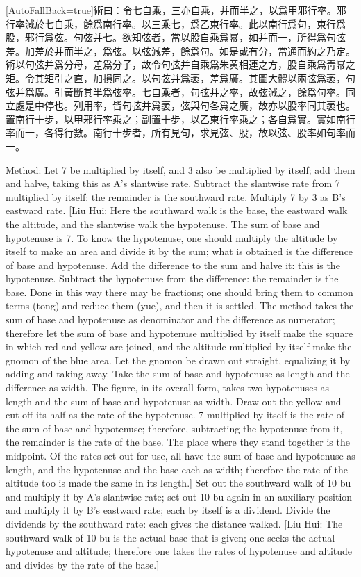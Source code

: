 \documentclass[11pt]{article}
\newcommand{\zhsmall}{\footnotesize\color{black!70}}
\newcommand{\unitlabel}[1]{\marginpar{\raggedleft\tiny\color{gray}#1}}
\newenvironment{unitzh}{\par\CJKfontspec{Noto Serif CJK SC}[AutoFallBack=true]\large\linespread{1.25}\selectfont}{\par}
\newenvironment{uniten}{\par\small\color{black!85}}{\par\medskip}
\begin{document}
\begin{unitzh}\unitlabel{jiuzhang-039.10}術曰：令七自乘，三亦自乘，并而半之，以爲甲邪行率。邪行率減於七自乘，餘爲南行率。以三乘七，爲乙東行率。{\zhsmall 此以南行爲句，東行爲股，邪行爲弦。句弦并七。欲知弦者，當以股自乘爲幂，如并而一，所得爲句弦差。加差於并而半之，爲弦。以弦減差，餘爲句。如是或有分，當通而約之乃定。術以句弦并爲分母，差爲分子，故令句弦并自乘爲朱黄相連之方，股自乘爲靑幂之矩。令其矩引之直，加損同之。以句弦并爲袤，差爲廣。其圖大體以兩弦爲袤，句弦并爲廣。引黃斷其半爲弦率。七自乘者，句弦并之率，故弦減之，餘爲句率。同立處是中停也。列用率，皆句弦并爲袤，弦與句各爲之廣，故亦以股率同其袤也。}置南行十步，以甲邪行率乘之；副置十步，以乙東行率乘之；各自爲實。實如南行率而一，各得行數。{\zhsmall 南行十步者，所有見句，求見弦、股，故以弦、股率如句率而一。}\end{unitzh}
\begin{uniten}Method: Let 7 be multiplied by itself, and 3 also be multiplied by itself; add them and halve, taking this as A's slantwise rate. Subtract the slantwise rate from 7 multiplied by itself: the remainder is the southward rate. Multiply 7 by 3 as B's eastward rate. [Liu Hui: Here the southward walk is the base, the eastward walk the altitude, and the slantwise walk the hypotenuse. The sum of base and hypotenuse is 7. To know the hypotenuse, one should multiply the altitude by itself to make an area and divide it by the sum; what is obtained is the difference of base and hypotenuse. Add the difference to the sum and halve it: this is the hypotenuse. Subtract the hypotenuse from the difference: the remainder is the base. Done in this way there may be fractions; one should bring them to common terms (tong) and reduce them (yue), and then it is settled. The method takes the sum of base and hypotenuse as denominator and the difference as numerator; therefore let the sum of base and hypotenuse multiplied by itself make the square in which red and yellow are joined, and the altitude multiplied by itself make the gnomon of the blue area. Let the gnomon be drawn out straight, equalizing it by adding and taking away. Take the sum of base and hypotenuse as length and the difference as width. The figure, in its overall form, takes two hypotenuses as length and the sum of base and hypotenuse as width. Draw out the yellow and cut off its half as the rate of the hypotenuse. 7 multiplied by itself is the rate of the sum of base and hypotenuse; therefore, subtracting the hypotenuse from it, the remainder is the rate of the base. The place where they stand together is the midpoint. Of the rates set out for use, all have the sum of base and hypotenuse as length, and the hypotenuse and the base each as width; therefore the rate of the altitude too is made the same in its length.] Set out the southward walk of 10 bu and multiply it by A's slantwise rate; set out 10 bu again in an auxiliary position and multiply it by B's eastward rate; each by itself is a dividend. Divide the dividends by the southward rate: each gives the distance walked. [Liu Hui: The southward walk of 10 bu is the actual base that is given; one seeks the actual hypotenuse and altitude; therefore one takes the rates of hypotenuse and altitude and divides by the rate of the base.]\end{uniten}
\end{document}
